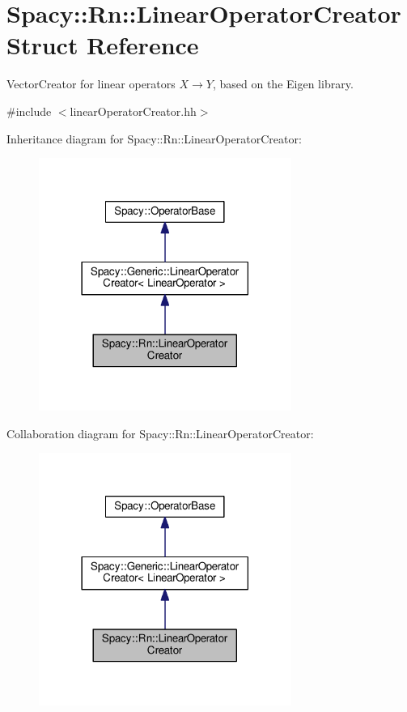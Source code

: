 \hypertarget{structSpacy_1_1Rn_1_1LinearOperatorCreator}{}\section{Spacy\+:\+:Rn\+:\+:Linear\+Operator\+Creator Struct Reference}
\label{structSpacy_1_1Rn_1_1LinearOperatorCreator}


Vector\+Creator for linear operators $X\rightarrow Y$, based on the Eigen library.  




{\ttfamily \#include $<$linear\+Operator\+Creator.\+hh$>$}



Inheritance diagram for Spacy\+:\+:Rn\+:\+:Linear\+Operator\+Creator\+:
\nopagebreak
\begin{figure}[H]
\begin{center}
\leavevmode
\includegraphics[width=234pt]{structSpacy_1_1Rn_1_1LinearOperatorCreator__inherit__graph}
\end{center}
\end{figure}


Collaboration diagram for Spacy\+:\+:Rn\+:\+:Linear\+Operator\+Creator\+:
\nopagebreak
\begin{figure}[H]
\begin{center}
\leavevmode
\includegraphics[width=234pt]{structSpacy_1_1Rn_1_1LinearOperatorCreator__coll__graph}
\end{center}
\end{figure}
